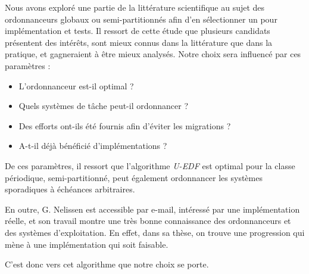 	Nous avons exploré une partie de la littérature scientifique au sujet des ordonnanceurs 
	globaux ou semi-partitionnés afin d'en sélectionner un pour implémentation et tests. 
	Il ressort de cette étude que plusieurs candidats présentent des intérêts, sont mieux 
	connus dans la littérature que dans la pratique, et gagneraient à être mieux analysés. 
	Notre choix sera influencé par ces paramètres : \medskip
	\begin{itemize}
		\item L'ordonnanceur est-il optimal ?
		\item Quels systèmes de tâche peut-il ordonnancer ?
		\item Des efforts ont-ils été fournis afin d'éviter les migrations ?
		\item A-t-il déjà bénéficié d'implémentations ?
	\end{itemize}
	De ces paramètres, il ressort que l'algorithme \textit{U-EDF} est optimal pour la classe périodique, 
	semi-partitionné, peut également ordonnancer les systèmes sporadiques à échéances arbitraires. 
	
	En outre, G. Nelissen est accessible par e-mail, intéressé par une implémentation réelle, 
	et son travail montre une très bonne connaissance des ordonnanceurs et des systèmes d'exploitation. En 
	effet, dans sa thèse, on trouve une progression qui mène à une implémentation qui soit faisable. 
	
	C'est donc vers cet algorithme que notre choix se porte.
